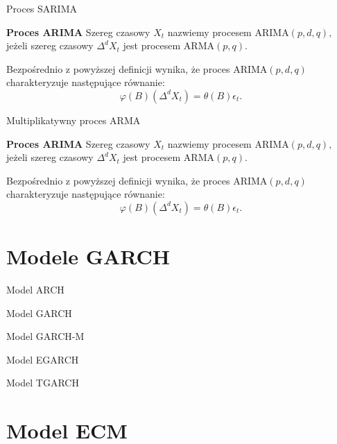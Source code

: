 \documentclass[a4paper, 11pt]{beamer}
\begin{document}
	\begin{frame}{Proces SARIMA}
		\begin{block}{\textbf{Proces ARIMA}}
			Szereg czasowy $X_t$ nazwiemy procesem $\mbox{ARIMA}\left(p, d, q\right),$ jeżeli
			szereg czasowy $\Delta^{d} X_t$ jest procesem $\mbox{ARMA}\left(p, q\right).$
		\end{block}
		Bezpośrednio z powyższej definicji wynika, że proces $\mbox{ARIMA}\left(p, d, q\right)$ charakteryzuje następujące równanie: \[
			\varphi\left(B\right)\left(\Delta^{d} X_{t}\right) = \theta\left(B\right) \epsilon_{t}.
		\]
	\end{frame}
	
	\begin{frame}{Multiplikatywny proces ARMA}
		\begin{block}{\textbf{Proces ARIMA}}
			Szereg czasowy $X_t$ nazwiemy procesem $\mbox{ARIMA}\left(p, d, q\right),$ jeżeli
			szereg czasowy $\Delta^{d} X_t$ jest procesem $\mbox{ARMA}\left(p, q\right).$
		\end{block}
		Bezpośrednio z powyższej definicji wynika, że proces $\mbox{ARIMA}\left(p, d, q\right)$ charakteryzuje następujące równanie: \[
			\varphi\left(B\right)\left(\Delta^{d} X_{t}\right) = \theta\left(B\right) \epsilon_{t}.
		\]
	\end{frame}
	
	\section{Modele GARCH}
	
	\begin{frame}{Model ARCH}
	\end{frame}
	
	\begin{frame}{Model GARCH}
	\end{frame}
	
	\begin{frame}{Model GARCH-M}
	\end{frame}
	
	\begin{frame}{Model EGARCH}
	\end{frame}
	
	\begin{frame}{Model TGARCH}
	\end{frame}
	
	\section{Model ECM}
	
\end{document}
